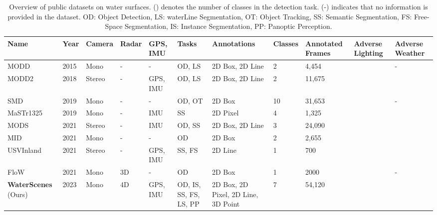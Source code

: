 \documentclass[lettersize,journal]{IEEEtran}
\begin{document}
\begin{table*}[!h]
\caption{Overview of public datasets on water surfaces. 
() denotes the number of classes in the detection task. 
(-) indicates that no information is provided in the dataset.
OD: Object Detection, LS: waterLine Segmentation, OT: Object Tracking, SS: Semantic Segmentation, FS: Free-Space Segmentation, IS: Instance Segmentation, PP: Panoptic Perception.}
\setlength\tabcolsep{5pt} \center
\footnotesize
\begin{tabular*}{\linewidth}{p{1.9cm}<{}p{0.7cm}<{\centering}p{1cm}<{\centering}p{0.8cm}<{\centering}p{1.5cm}<{\centering}p{1.6cm}<{\centering}p{2.2cm}<{\centering}p{1.2cm}<{\centering}p{1.2cm}<{\centering}p{1.1cm}<{\centering}p{1.1cm}<{\centering}}
\toprule

\bf{Name} & \bf{Year} & \bf{Camera} & \bf{Radar} & \bf{GPS, IMU} & \bf{Tasks} & \bf{Annotations} & \bf{Classes } & \bf{Annotated Frames} & \bf{Adverse Lighting} & \bf{Adverse Weather}\\\midrule
MODD \cite{kristan2015fast} & 2015 & Mono & - & - & OD, LS & 2D Box, 2D Line & 2 & 4,454 &  & -  \\
MODD2 \cite{bovcon2018stereo} & 2018 & Stereo & - & GPS, IMU & OD, LS & 2D Box, 2D Line & 2 & 11,675 &  &  \\
SMD \cite{moosbauer2019benchmark} & 2019 & Mono & - & - & OD, OT & 2D Box & 10 & 31,653 &  & - \\
MaSTr1325 \cite{bovcon2019mastr1325} & 2019 & Mono & -  & IMU & SS & 2D Pixel & 4 & 1,325 &  &  \\
MODS \cite{bovcon2021mods} & 2021 & Stereo & - & IMU & OD, SS & 2D Box, 2D Line & 3 & 24,090 &  &  \\
MID \cite{liu2021efficient} & 2021 & Mono & - & - & OD & 2D Box & 2 & 2,655 &  &   \\
USVInland \cite{cheng2021we} & 2021 & Stereo & - & GPS, IMU & SS, FS & 2D Line & 1 & 700 &  & \\
FloW \cite{cheng2021flow} & 2021 & Mono & 3D & - & OD & 2D Box & 1 & 2000 &  & -\\
\midrule
\textbf{WaterScenes} (Ours) & 2023 & Mono & 4D & GPS, IMU & OD, IS, SS, FS, LS, PP & 2D Box, 2D Pixel, 2D Line, 3D Point & 7 & 54,120 &  &   \\
\bottomrule
\end{tabular*}
\label{tab:related-datasets}
\end{table*}
\end{document}
